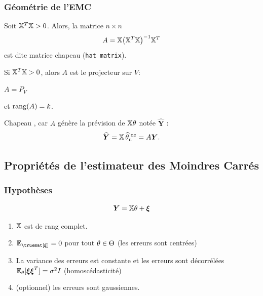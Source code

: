 \begin{frame} \frametitle{Géométrie de l'EMC}
Soit $\mathbb{X}^T\mathbb{X}>0$. Alors, la matrice $n\times n$
$$
A = \mathbb{X}\big(\mathbb{X}^T\mathbb{X}\big)^{-1}\mathbb{X}^T
$$
est dite \alert{matrice chapeau} (\texttt{hat matrix}).
%
\begin{prop}
Si $\mathbb{X}^T\mathbb{X}>0$, alors $A$ est le projecteur sur
$V$:\\\vspace{2mm} \centerline{$A=P_V$} et ${\rm rang}(A)=k$.
\end{prop}
\alert{\og Chapeau \fg{}}, car $A$ génère la prévision de
$\mathbb{X}\theta$ notée $\widehat{\boldsymbol{Y}}$ :
$$\widehat{\boldsymbol{Y}}= \mathbb{X}\operatorname{\widehat \theta_n^{\,\,{\tt mc}}}= A\boldsymbol{Y}.$$
\end{frame}



\subsection{Propriétés de l'estimateur des Moindres Carrés}

\begin{frame}
\frametitle{Hypothèses}
\[
\operatorname{\boldsymbol{Y}}= \mathbb{X} \theta + \boldsymbol{\xi}
\]
\begin{enumerate}
\item $\mathbb{X}$ est de rang complet.
\item $\PE_\truemat[\bnoise]= 0$ pour tout $\theta \in \Theta$  (les erreurs sont centrées)
\item La variance des erreurs est constante et les erreurs sont décorrélées $\operatorname{{\mathbb E}}_{\theta}[\boldsymbol{\xi} \boldsymbol{\xi}^T] = \sigma^2 I$ (homoscédasticité)
\item (optionnel) les erreurs sont gaussiennes.
\end{enumerate}
\end{frame}

